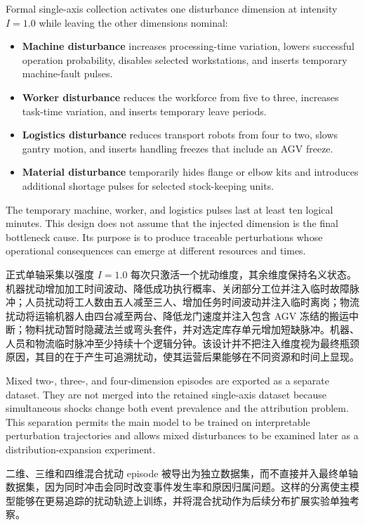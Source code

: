 \documentclass[a4paper,fleqn]{cas-dc}
\newcommand{\zhpara}[1]{%
  \par\begingroup\small\color{black!72}\noindent #1\par\endgroup}
\begin{document}
Formal single-axis collection activates one disturbance dimension at intensity $I=1.0$ while leaving the other dimensions nominal:
\begin{itemize}
 \item[$\bullet$] \textbf{Machine disturbance} increases processing-time variation, lowers successful operation probability, disables selected workstations, and inserts temporary machine-fault pulses.
 \item[$\bullet$] \textbf{Worker disturbance} reduces the workforce from five to three, increases task-time variation, and inserts temporary leave periods.
 \item[$\bullet$] \textbf{Logistics disturbance} reduces transport robots from four to two, slows gantry motion, and inserts handling freezes that include an AGV freeze.
 \item[$\bullet$] \textbf{Material disturbance} temporarily hides flange or elbow kits and introduces additional shortage pulses for selected stock-keeping units.
\end{itemize}
The temporary machine, worker, and logistics pulses last at least ten logical minutes. This design does not assume that the injected dimension is the final bottleneck cause. Its purpose is to produce traceable perturbations whose operational consequences can emerge at different resources and times.

\zhpara{正式单轴采集以强度 $I=1.0$ 每次只激活一个扰动维度，其余维度保持名义状态。机器扰动增加加工时间波动、降低成功执行概率、关闭部分工位并注入临时故障脉冲；人员扰动将工人数由五人减至三人、增加任务时间波动并注入临时离岗；物流扰动将运输机器人由四台减至两台、降低龙门速度并注入包含 AGV 冻结的搬运中断；物料扰动暂时隐藏法兰或弯头套件，并对选定库存单元增加短缺脉冲。机器、人员和物流临时脉冲至少持续十个逻辑分钟。该设计并不把注入维度视为最终瓶颈原因，其目的在于产生可追溯扰动，使其运营后果能够在不同资源和时间上显现。}

Mixed two-, three-, and four-dimension episodes are exported as a separate dataset. They are not merged into the retained single-axis dataset because simultaneous shocks change both event prevalence and the attribution problem. This separation permits the main model to be trained on interpretable perturbation trajectories and allows mixed disturbances to be examined later as a distribution-expansion experiment.

\zhpara{二维、三维和四维混合扰动 episode 被导出为独立数据集，而不直接并入最终单轴数据集，因为同时冲击会同时改变事件发生率和原因归属问题。这样的分离使主模型能够在更易追踪的扰动轨迹上训练，并将混合扰动作为后续分布扩展实验单独考察。}
\end{document}
